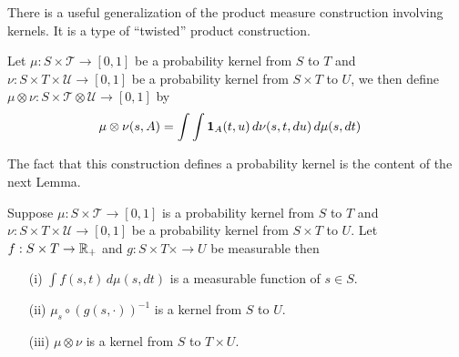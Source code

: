 There is a useful generalization of the product measure construction
involving kernels.  It is a type of ``twisted'' product construction.
\begin{defn}Let $\mu : S \times \mathcal{T} \to [0,1]$ be a
  probability kernel from $S$ to $T$ and $\nu : S \times T \times
  \mathcal{U} \to [0,1]$ be a probability kernel from $S \times T$ to
  $U$, we then define $\mu \otimes \nu : S \times \mathcal{T} \otimes
  \mathcal{U} \to [0,1]$ by
\begin{align*}
\mu \otimes \nu(s, A) &= \int \int \textbf{1}_{A}(t,u) \,
d\nu(s,t,du) \, d\mu(s, dt)
\end{align*}
\end{defn}

The fact that this construction defines a probability kernel is the
content of the next Lemma.
\begin{lem}Suppose $\mu : S \times \mathcal{T} \to [0,1]$ is a
  probability kernel from $S$ to $T$ and $\nu : S \times T \times
  \mathcal{U} \to [0,1]$ be a probability kernel from $S \times T$ to
  $U$.  Let $f : S \times T \to \mathbb{R}_+$ and $g
  : S \times T \times \to U$  be measurable then 
\begin{itemize}
\item[(i)] $\int f (s, t) \, d\mu(s,dt)$ is a measurable function of $s \in S$.
\item[(ii)] $\mu_s \circ (g(s, \cdot))^{-1}$ is a kernel from $S$ to $U$.
\item[(iii)] $\mu \otimes \nu$ is a kernel from $S$ to $T \times U$.
\end{itemize}
\end{lem}
